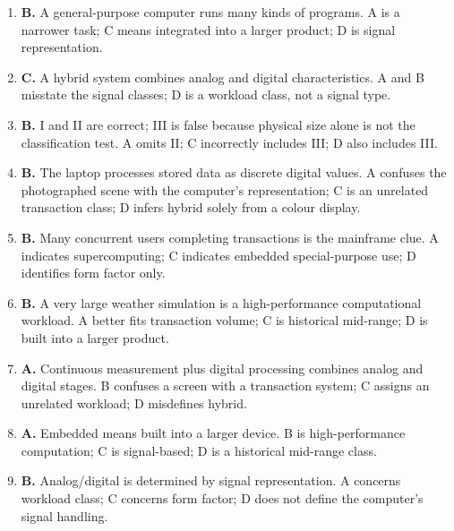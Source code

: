 \begin{enumerate}[label=\textbf{Q\arabic*.}, leftmargin=*]
  handles a limited task. B is a multi-user transaction class; C is
  high-performance computation; D mixes signal and size labels.
\item \textbf{B.} A general-purpose computer runs many kinds of programs. A
  is a narrower task; C means integrated into a larger product; D is
  signal representation.
\item \textbf{C.} A hybrid system combines analog and digital characteristics.
  A and B misstate the signal classes; D is a workload class, not a signal
  type.
\item \textbf{B.} I and II are correct; III is false because physical size
  alone is not the classification test. A omits II; C incorrectly includes
  III; D also includes III.
\item \textbf{B.} The laptop processes stored data as discrete digital
  values. A confuses the photographed scene with the computer's
  representation; C is an unrelated transaction class; D infers hybrid
  solely from a colour display.
\item \textbf{B.} Many concurrent users completing transactions is the
  mainframe clue. A indicates supercomputing; C indicates embedded
  special-purpose use; D identifies form factor only.
\item \textbf{B.} A very large weather simulation is a high-performance
  computational workload. A better fits transaction volume; C is historical
  mid-range; D is built into a larger product.
\item \textbf{A.} Continuous measurement plus digital processing combines
  analog and digital stages. B confuses a screen with a transaction system;
  C assigns an unrelated workload; D misdefines hybrid.
\item \textbf{A.} Embedded means built into a larger device. B is
  high-performance computation; C is signal-based; D is a historical
  mid-range class.
\item \textbf{B.} Analog/digital is determined by signal representation.
  A concerns workload class; C concerns form factor; D does not define the
  computer's signal handling.


\end{enumerate}
